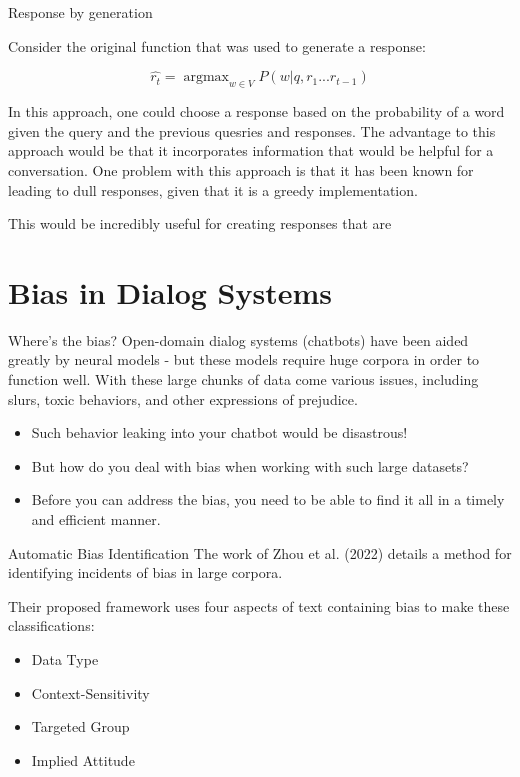\documentclass[10pt]{beamer}
\DeclareMathOperator*{\argmax}{argmax} %
\begin{document}
\begin{frame}{Response by generation}

Consider the original function that was used to generate a response:

\[
\hat{r_t} = \argmax_{w\in V} P(w|q, r_1...r_{t - 1})
\]

In this approach, one could choose a response based on the probability of a word given the query and the previous quesries and responses.  The advantage to this approach would be that it incorporates information that would be helpful for a conversation.  One problem with this approach is that it has been known for leading to dull responses, given that it is a greedy implementation.


This would be incredibly useful for creating responses that are 

\end{frame}

\section[Bias in Dialog Systems]{Bias in Dialog Systems}

\begin{frame}{Where's the bias?}
Open-domain dialog systems (chatbots) have been aided greatly by neural models - but these models require huge corpora in order to function well. With these large chunks of data come various issues, including slurs, toxic behaviors, and other expressions of prejudice.
\begin{itemize}
    \item Such behavior leaking into your chatbot would be disastrous!
    \item But how do you deal with bias when working with such large datasets?
    \item Before you can address the bias, you need to be able to find it all in a timely and efficient manner.
\end{itemize}
\end{frame}

\begin{frame}{Automatic Bias Identification}
The work of Zhou et al. (2022) \cite{bias} details a method for identifying incidents of bias in large corpora.

Their proposed framework uses four aspects of text containing bias to make these classifications:
\begin{itemize}
    \item Data Type
    \item Context-Sensitivity
    \item Targeted Group
    \item Implied Attitude
\end{itemize}
\end{frame}
\end{document}
